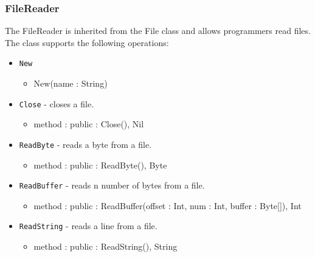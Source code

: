 \documentclass[12pt]{article}
\begin{document}
\subsubsection{FileReader}
The FileReader is inherited from the File class and allows programmers read files.    The class supports the following operations:
\begin{itemize}
    \item \texttt{New}
    	\begin{itemize}
	\item New(name : String)
	\end{itemize}
    \item \texttt{Close} - closes a file.
    	\begin{itemize}
	\item method : public : Close(), Nil
	\end{itemize}
    \item \texttt{ReadByte} - reads a byte from a file.
    	\begin{itemize}
	\item method : public : ReadByte(), Byte
	\end{itemize}
    \item \texttt{ReadBuffer} - reads n number of bytes from a file.
    	\begin{itemize}
	\item method : public : ReadBuffer(offset : Int, num : Int, buffer : Byte[]), Int
	\end{itemize}
    \item \texttt{ReadString} - reads a line from a file.
    	\begin{itemize}
	\item method : public : ReadString(), String
	\end{itemize}
\end{itemize}
\end{document}
